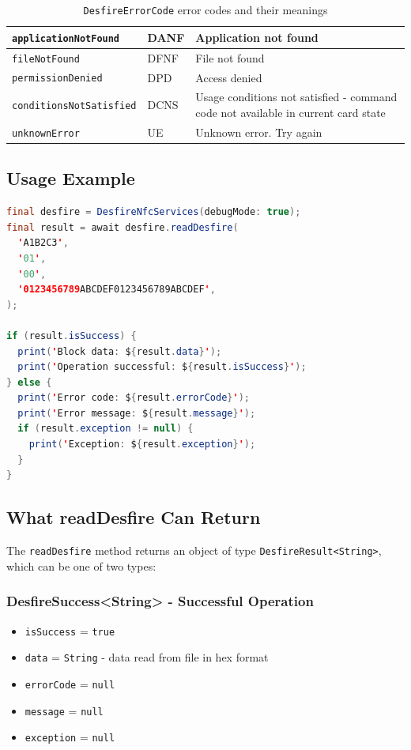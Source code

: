 \documentclass[a4paper,12pt]{article}
\begin{document}
\begin{table}[h!]
\begin{tabular}{|l|l|p{6cm}|}
\hline
\texttt{applicationNotFound} & DANF & Application not found \\
\hline
\texttt{fileNotFound} & DFNF & File not found \\
\hline
\texttt{permissionDenied} & DPD & Access denied \\
\hline
\texttt{conditionsNotSatisfied} & DCNS & Usage conditions not satisfied - command code not available in current card state \\
\hline
\texttt{unknownError} & UE & Unknown error. Try again \\
\hline
\end{tabular}
\caption{\texttt{DesfireErrorCode} error codes and their meanings}
\end{table}

\newpage

\subsection{Usage Example}
\begin{lstlisting}[language=Java]
final desfire = DesfireNfcServices(debugMode: true);
final result = await desfire.readDesfire(
  'A1B2C3',
  '01',
  '00',
  '0123456789ABCDEF0123456789ABCDEF',
);

if (result.isSuccess) {
  print('Block data: ${result.data}');
  print('Operation successful: ${result.isSuccess}');
} else {
  print('Error code: ${result.errorCode}');
  print('Error message: ${result.message}');
  if (result.exception != null) {
    print('Exception: ${result.exception}');
  }
}
\end{lstlisting}

\subsection{What readDesfire Can Return}

The \texttt{readDesfire} method returns an object of type \texttt{DesfireResult<String>}, which can be one of two types:

\subsubsection*{DesfireSuccess<String> - Successful Operation}
\begin{itemize}
    \item \texttt{isSuccess} = \texttt{true}
    \item \texttt{data} = \texttt{String} - data read from file in hex format
    \item \texttt{errorCode} = \texttt{null}
    \item \texttt{message} = \texttt{null}
    \item \texttt{exception} = \texttt{null}
\end{itemize}
\end{document}
